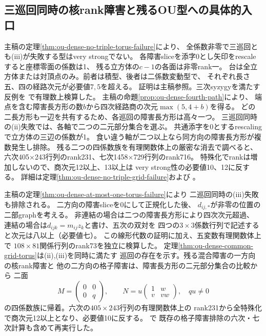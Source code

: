 \documentclass[11pt,a4paper]{ltjsarticle}
\begin{document}
\subsection*{三巡回同時の核rank障害と残るOU型への具体的入口}
主稿の定理\ref{thm:ou-dense-no-triple-torus-failure}により、
全係数非零で三巡回とも(iii)が失敗する型はvery strongでない。
各障害sliceを添字0とし矢印をrescaleすると座標零面の係数は1、
残る立方体の$c-1$の各面は非零rank一。
台は全立方体または対頂点のみ。前者は積型、後者は二係数変動型で、
それぞれ長さ五、四の経路次元が必要値$7,5$を超える。
証明は主稿参照。三次syzygyを満たす反例を
で有理数上検算した。
主稿の命題\ref{prop:ou-dense-fourth-path}により、
端点を含む障害長方形の数$b$から四次経路商の次元$\max(5,4+b)$を得る。
どの二長方形も一辺を共有するため、各巡回の障害長方形は高々一つ。
三巡回同時の(ii)失敗では、各軸で二つの二元部分集合を選ぶ。
共通添字を0とするrescalingで立方体の三辺の係数が1。
食い違う軸が二つ以上なら同方向の障害長方形が複数発生し排除。
残る二つの四係数族を有理関数体上の厳密な消去で調べると、
六次405×243行列のrank231、七次1458×729行列のrank716。
特殊化でrankは増加しないので、商次元12以上、13以上は
very strong性の必要値10、12に反する。
詳細は定理\ref{thm:ou-dense-no-triple-grid-failure}および
。

主稿の定理\ref{thm:ou-dense-at-most-one-torus-failure}により
二巡回同時の(iii)失敗も排除される。
二方向の障害sliceを0にして正規化した後、
$d_{ij,*}$が非零の位置の二部graphを考える。
非連結の場合は二つの障害長方形により四次次元超過、
連結の場合は$d_{ijk}=m_{ij}z_k$と書け、五次の双対を
四つの$3\times3$係数行列で記述すると次元は八以上（必要値七）。
この線形代数の証明に加え、五変数有理関数体上で
$108\times81$関係行列のrank73を独立に検算した。
定理\ref{thm:ou-dense-common-grid-torus}は(ii),(iii)を同時に満たす
巡回の存在を示す。残る混合障害の一方向の核rank障害と
他の二方向の格子障害は、障害長方形の二元部分集合の比較から
二面
\[
 M=\begin{pmatrix}0&0\\0&q\end{pmatrix},\qquad
 N=u\begin{pmatrix}1&w\\v&vw\end{pmatrix},\quad qu\ne0
\]
の四係数族に帰着。六次の$405\times243$行列の有理関数体上の
rank231から全特殊化で商次元12以上となり、必要値10に反する。
で
既存の格子障害排除の六次・七次計算も含めて再実行した。
\end{document}
